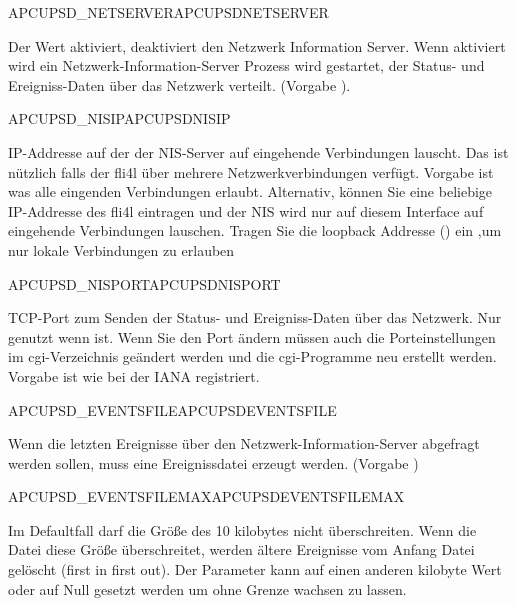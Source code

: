 \begin {description}

 {APCUPSD\_NETSERVER}{APCUPSDNETSERVER}
 
  Der Wert  aktiviert,  deaktiviert den Netzwerk 
  Information Server. Wenn aktiviert wird ein Netzwerk-Information-Server 
  Prozess wird gestartet, der Status- und Ereigniss-Daten über das Netzwerk verteilt.
  (Vorgabe ).


 {APCUPSD\_NISIP}{APCUPSDNISIP}
 
  IP-Addresse auf der der NIS-Server auf eingehende Verbindungen lauscht.
  Das ist nützlich falls der fli4l über mehrere Netzwerkverbindungen 
  verfügt. Vorgabe ist  was alle eingenden Verbindungen erlaubt.
  Alternativ, können Sie eine beliebige IP-Addresse des fli4l eintragen und der 
  NIS wird nur auf diesem Interface auf eingehende Verbindungen lauschen.
  Tragen Sie die loopback Addresse () ein ,um nur lokale 
  Verbindungen zu erlauben


 {APCUPSD\_NISPORT}{APCUPSDNISPORT}
 
  TCP-Port zum Senden der Status- und Ereigniss-Daten über das Netzwerk.
  Nur genutzt wenn 
   ist.
  Wenn Sie den Port ändern müssen auch die Porteinstellungen im cgi-Verzeichnis 
  geändert werden und die cgi-Programme neu erstellt werden.
  Vorgabe ist  wie bei der IANA registriert.


 {APCUPSD\_EVENTSFILE}{APCUPSDEVENTSFILE}
 
  Wenn die letzten Ereignisse über den Netzwerk-Information-Server abgefragt 
  werden sollen, muss eine Ereignissdatei erzeugt werden.
  (Vorgabe )


 {APCUPSD\_EVENTSFILEMAX}{APCUPSDEVENTSFILEMAX}

  Im Defaultfall darf die Größe des  
  10 kilobytes nicht überschreiten.  
  Wenn die Datei diese Größe überschreitet, werden ältere Ereignisse vom Anfang 
  Datei gelöscht (first in first out). 
  Der Parameter  kann auf einen anderen kilobyte  
  Wert oder auf Null gesetzt werden um 
   ohne Grenze wachsen 
  zu lassen.

\end {description}

